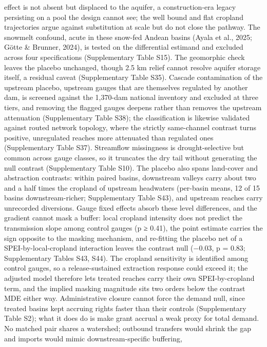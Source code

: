 \documentclass[
]{agujournal2019}
\begin{document}
effect is not absent but displaced to the aquifer, a construction-era
legacy persisting on a pool the design cannot see; the well bound and
flat cropland trajectories argue against substitution at scale but do
not close the pathway. The snowmelt confound, acute in these snow-fed
Andean basins (Ayala et al., 2025; Götte \& Brunner, 2024), is tested on
the differential estimand and excluded across four specifications
(Supplementary Table S15). The geomorphic check leaves the placebo
unchanged, though 2.5 km relief cannot resolve aquifer storage itself, a
residual caveat (Supplementary Table S35). Cascade contamination of the
upstream placebo, upstream gauges that are themselves regulated by
another dam, is screened against the 1,370-dam national inventory and
excluded at three tiers, and removing the flagged gauges deepens rather
than removes the upstream attenuation (Supplementary Table S38); the
classification is likewise validated against routed network topology,
where the strictly same-channel contrast turns positive, unregulated
reaches more attenuated than regulated ones (Supplementary Table S37).
Streamflow missingness is drought-selective but common across gauge
classes, so it truncates the dry tail without generating the null
contrast (Supplementary Table S10). The placebo also spans land-cover
and abstraction contrasts: within paired basins, downstream valleys
carry about two and a half times the cropland of upstream headwaters
(per-basin means, 12 of 15 basins downstream-richer; Supplementary Table
S43), and upstream reaches carry unrecorded diversions. Gauge fixed
effects absorb these level differences, and the gradient cannot mask a
buffer: local cropland intensity does not predict the transmission slope
among control gauges (p ≥ 0.41), the point estimate carries the sign
opposite to the masking mechanism, and re-fitting the placebo net of a
SPEI-by-local-cropland interaction leaves the contrast null (\(-0.03\),
p = 0.83; Supplementary Tables S43, S44). The cropland sensitivity is
identified among control gauges, so a release-sustained extraction
response could exceed it; the adjusted model therefore lets treated
reaches carry their own SPEI-by-cropland term, and the implied masking
magnitude sits two orders below the contrast MDE either way.
Administrative closure cannot force the demand null, since treated
basins kept accruing rights faster than their controls (Supplementary
Table S2); what it does do is make grant accrual a weak proxy for total
demand. No matched pair shares a watershed; outbound transfers would
shrink the gap and imports would mimic downstream-specific buffering,
\end{document}
